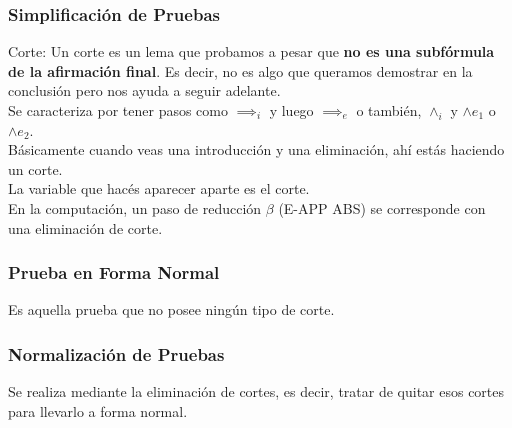 \documentclass[10pt,a4paper]{article}
\begin{document}
\subsubsection{Simplificación de Pruebas}
Corte: Un corte es un lema que probamos a pesar que \textbf{no es una subfórmula de la afirmación final}. Es decir, no es algo que queramos demostrar en la conclusión pero nos ayuda a seguir adelante. \\
Se caracteriza por tener pasos como $\implies_{i}$ y luego $\implies_{e}$ o también, $\land_{i}$ y $\land e_{1}$ o $\land e_{2}$. \\
Básicamente cuando veas una introducción y una eliminación, ahí estás haciendo un corte. \\
La variable que hacés aparecer aparte es el corte. \\
En la computación, un paso de reducción $\beta$ (E-APP ABS) se corresponde con una eliminación de corte. 
\subsubsection{Prueba en Forma Normal}
Es aquella prueba que no posee ningún tipo de corte. 
\subsubsection{Normalización de Pruebas}
Se realiza mediante la eliminación de cortes, es decir, tratar de quitar esos cortes para llevarlo a forma normal. 
\end{document}
